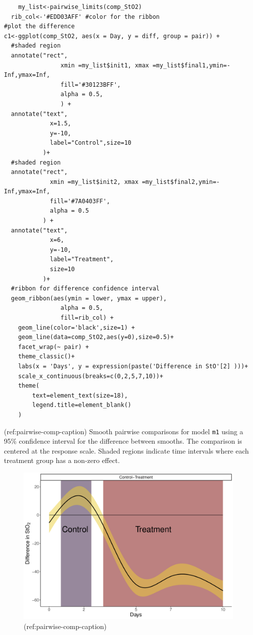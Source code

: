\documentclass[Royal,times,sagev]{sagej}
\begin{document}
\begin{verbatim}
    my_list<-pairwise_limits(comp_StO2)
  rib_col<-'#EDD03AFF' #color for the ribbon
#plot the difference
c1<-ggplot(comp_StO2, aes(x = Day, y = diff, group = pair)) +
  #shaded region
  annotate("rect",
                xmin =my_list$init1, xmax =my_list$final1,ymin=-Inf,ymax=Inf,
                fill='#30123BFF',
                alpha = 0.5,
                ) +
  annotate("text",
             x=1.5,
             y=-10,
             label="Control",size=10
           )+
  #shaded region  
  annotate("rect",
             xmin =my_list$init2, xmax =my_list$final2,ymin=-Inf,ymax=Inf,
             fill='#7A0403FF',
             alpha = 0.5
           ) +
  annotate("text",
             x=6,
             y=-10,
             label="Treatment",
             size=10
           )+
  #ribbon for difference confidence interval  
  geom_ribbon(aes(ymin = lower, ymax = upper),
                alpha = 0.5,
                fill=rib_col) +
    geom_line(color='black',size=1) +
    geom_line(data=comp_StO2,aes(y=0),size=0.5)+
    facet_wrap(~ pair) +
    theme_classic()+
    labs(x = 'Days', y = expression(paste('Difference in StO'[2] )))+
    scale_x_continuous(breaks=c(0,2,5,7,10))+
    theme(
        text=element_text(size=18),
        legend.title=element_blank()
    )
\end{verbatim}

(ref:pairwise-comp-caption) Smooth pairwise comparisons for model
\texttt{m1} using a 95\% confidence interval for the difference between
smooths. The comparison is centered at the response scale. Shaded
regions indicate time intervals where each treatment group has a
non-zero effect.

\begin{figure}

{\centering \includegraphics[width=0.75\linewidth]{Full_document_SAGE_files/figure-latex/pairwise-comp-workflow-fig-1} 

}

\caption{(ref:pairwise-comp-caption)}\label{fig:pairwise-comp-workflow-fig}
\end{figure}
\end{document}
